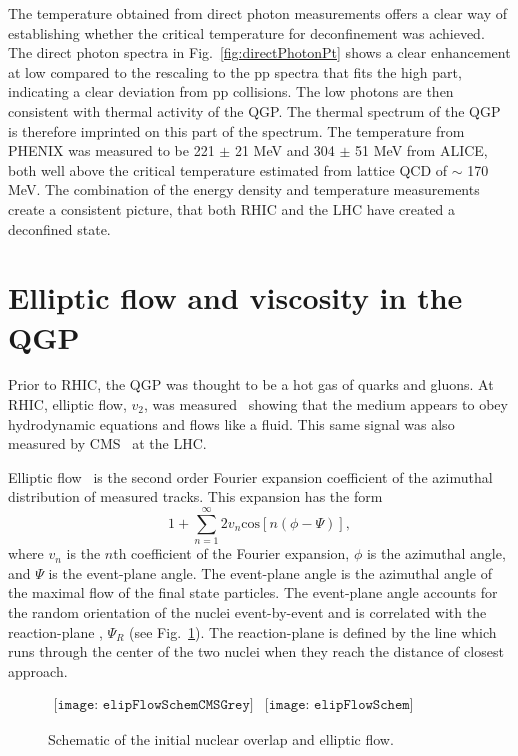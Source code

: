     The temperature obtained from direct photon measurements offers a clear
      way of establishing whether the critical temperature for deconfinement
      was achieved. 
    The direct photon \pt{} spectra in Fig.~\ref{fig:directPhotonPt} shows a 
      clear enhancement at low \pt{} compared to the rescaling to the pp 
      spectra that fits the high \pt{} part, indicating a clear deviation from 
      pp collisions.
    The low \pt{} photons are then consistent with thermal activity of
      the QGP.
    The thermal spectrum of the QGP is therefore imprinted on this part of 
      the spectrum.
    The temperature from PHENIX was measured to be 221 $\pm$ 21 MeV and 
      304 $\pm$ 51 MeV from ALICE, both well above the critical temperature
      estimated from lattice QCD of $\sim$ 170 MeV.
    The combination of the energy density and temperature measurements
      create a consistent picture, that both RHIC and the LHC have created a 
      deconfined state.

  \section{Elliptic flow and viscosity in the QGP \label{sec:elipFlow}}
    Prior to RHIC, the QGP was thought to be a hot gas of quarks and gluons.
    At RHIC, elliptic flow, $v_{2}$, was measured~\cite{Ackermann:2000tr} showing that the medium 
      appears to obey hydrodynamic equations and flows like a fluid.
    This same signal was also measured by CMS~\cite{cmsFlow} at the LHC. 

    Elliptic flow~\cite{Ollitrault:1992bk,Sorensen:2009cz} is the second order Fourier expansion coefficient  
      of the azimuthal distribution of measured tracks.
    This expansion has the form
    \begin{equation}
      1+\sum^{\infty}_{n=1}2v_{n}\mathrm{cos}\left[n\left(\phi-\Psi\right)\right],
      \label{eg:v2Expand}
    \end{equation}
      where $v_{n}$ is the $n$th coefficient of the Fourier expansion, $\phi$
      is the azimuthal angle, and $\Psi$ is the event-plane angle.
    The event-plane angle is the azimuthal angle of the maximal flow of 
      the final state particles.   
    The event-plane angle accounts for the random orientation of the 
      nuclei event-by-event and is correlated with the reaction-plane
      , $\Psi_{R}$ (see Fig.~\ref{fig:elipSchem}).
    The reaction-plane is defined by the line which runs through the center
      of the two nuclei when they reach the distance of closest approach. 
    \begin{figure}[!Hhbt]
      \centering
      $ \begin{array}{cc}
      \texttt{[image: elipFlowSchemCMSGrey]} &
      \texttt{[image: elipFlowSchem]}
      \end{array} $
      \caption{Schematic of the initial nuclear overlap and elliptic flow.}
      \label{fig:elipSchem}
    \end{figure}

